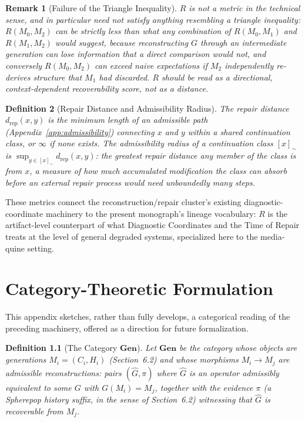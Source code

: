 \documentclass[11pt]{book}
\newtheorem{definition}{Definition}[chapter]
\newtheorem{remark}[definition]{Remark}
\begin{document}
\begin{remark}[Failure of the Triangle Inequality]
$R$ is not a metric in the technical sense, and in particular need not satisfy anything resembling a triangle inequality: $R(M_0,M_2)$ can be strictly less than what any combination of $R(M_0,M_1)$ and $R(M_1,M_2)$ would suggest, because reconstructing $G$ through an intermediate generation can lose information that a direct comparison would not, and conversely $R(M_0,M_2)$ can exceed naive expectations if $M_2$ independently re-derives structure that $M_1$ had discarded. $R$ should be read as a directional, context-dependent recoverability score, not as a distance.
\end{remark}

\begin{definition}[Repair Distance and Admissibility Radius]
The \emph{repair distance} $d_{\mathrm{rep}}(x,y)$ is the minimum length of an admissible path (Appendix~\ref{app:admissibility}) connecting $x$ and $y$ within a shared continuation class, or $\infty$ if none exists. The \emph{admissibility radius} of a continuation class $[x]_\sim$ is $\sup_{y\in[x]_\sim} d_{\mathrm{rep}}(x,y)$: the greatest repair distance any member of the class is from $x$, a measure of how much accumulated modification the class can absorb before an external repair process would need unboundedly many steps.
\end{definition}

These metrics connect the reconstruction/repair cluster's existing diagnostic-coordinate machinery to the present monograph's lineage vocabulary: $R$ is the artifact-level counterpart of what Diagnostic Coordinates and the Time of Repair treats at the level of general degraded systems, specialized here to the media-quine setting.

\chapter{Category-Theoretic Formulation}
\label{app:category}

This appendix sketches, rather than fully develops, a categorical reading of the preceding machinery, offered as a direction for future formalization.

\begin{definition}[The Category $\mathbf{Gen}$]
Let $\mathbf{Gen}$ be the category whose objects are generations $M_i = (C_i,H_i)$ (Section~6.2) and whose morphisms $M_i \to M_j$ are admissible reconstructions: pairs $(\widehat{G}, \pi)$ where $\widehat{G}$ is an operator admissibly equivalent to some $G$ with $G(M_i)=M_j$, together with the evidence $\pi$ (a Spherepop history suffix, in the sense of Section~6.2) witnessing that $\widehat{G}$ is recoverable from $M_j$.
\end{definition}
\end{document}
